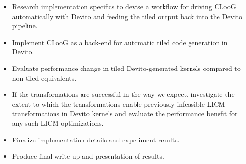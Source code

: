 \documentclass[a4paper,12pt,twoside]{report}
\begin{document}
\begin{itemize}
\begin{itemize}
        \end{itemize}
    \item Research implementation specifics to devise a workflow for driving CLooG automatically with Devito and feeding the tiled output back into the Devito pipeline.
    \item Implement CLooG as a back-end for automatic tiled code generation in Devito.
    \item Evaluate performance change in tiled Devito-generated kernels compared to non-tiled equivalents.
    \item If the transformations are successful in the way we expect, investigate the extent to which the transformations enable previously infeasible LICM transformations
        in Devito kernels and evaluate the performance benefit for any such LICM optimizations.
    \item Finalize implementation details and experiment results.
    \item Produce final write-up and presentation of results.
\end{itemize}
\end{document}
